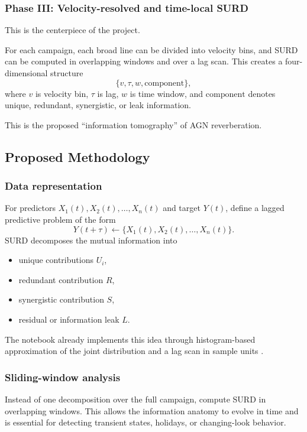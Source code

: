 \documentclass{article}
\begin{document}
\subsubsection{Phase III: Velocity-resolved and time-local SURD}

This is the centerpiece of the project.

For each campaign, each broad line can be divided into velocity bins, and SURD can be computed in overlapping windows and over a lag scan. This creates a four-dimensional structure
\[
\{v,\tau,w,\mathrm{component}\},
\]
where \(v\) is velocity bin, \(\tau\) is lag, \(w\) is time window, and \(\mathrm{component}\) denotes unique, redundant, synergistic, or leak information.

This is the proposed ``information tomography'' of AGN reverberation.

\subsection{Proposed Methodology}

\subsubsection{Data representation}

For predictors \(X_1(t), X_2(t), \dots, X_n(t)\) and target \(Y(t)\), define a lagged predictive problem of the form
\[
Y(t+\tau) \leftarrow \{X_1(t), X_2(t), \dots, X_n(t)\}.
\]
SURD decomposes the mutual information into
\begin{itemize}
    \item unique contributions \(U_i\),
    \item redundant contribution \(R\),
    \item synergistic contribution \(S\),
    \item residual or information leak \(L\).
\end{itemize}

The notebook already implements this idea through histogram-based approximation of the joint distribution and a lag scan in sample units \cite{AGN_SURD_notebook}.

\subsubsection{Sliding-window analysis}

Instead of one decomposition over the full campaign, compute SURD in overlapping windows. This allows the information anatomy to evolve in time and is essential for detecting transient states, holidays, or changing-look behavior.
\end{document}
